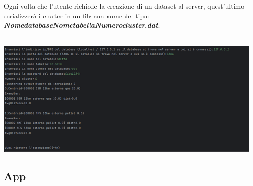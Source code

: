 \begin{enumerate}
\begin{itemize}[label=-]
    Ogni volta che l'utente richiede la creazione di un dataset al server, quest'ultimo serializzerà i cluster in un file con nome del tipo: \textbf{\textit{NomedatabaseNometabellaNumerocluster.dat}}. \\ \\
    \begin{minipage}[t]{0.3\textwidth}
      \includegraphics[scale=0.8]{img/test14.png}
    \end{minipage}
  \end{itemize}
\end{enumerate}

\subsection{App}